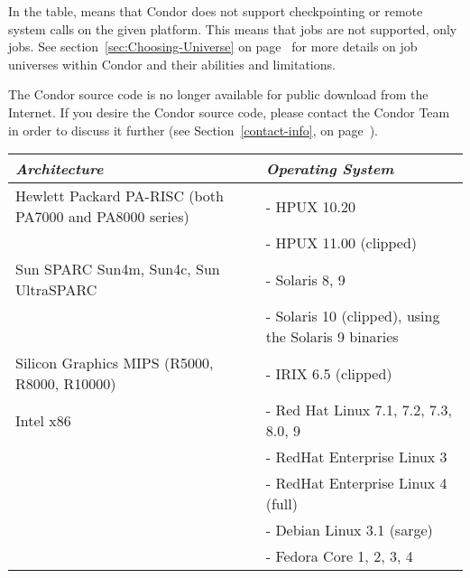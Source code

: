 In the table,  means that Condor does not support
checkpointing or remote system calls on the given platform. 
This means that  jobs are not supported, only
 jobs.
See section~\ref{sec:Choosing-Universe} on
page~\pageref{sec:Choosing-Universe} for more details on job universes
within Condor and their abilities and limitations.

The Condor source code is no longer available for public download from the Internet.  If you 
desire the Condor source code, please contact the Condor Team in order to discuss it further 
(see Section~\ref{contact-info}, on page~\pageref{contact-info}).

\begin{center}
\begin{table}[hbt]
\begin{tabular}{|p{6cm}p{7cm}|} \hline
\emph{Architecture} & \emph{Operating System} \\ \hline  \hline
Hewlett Packard PA-RISC (both PA7000 and PA8000 series) & - HPUX 10.20 \\
 & - HPUX 11.00 (clipped) \\ \hline
Sun SPARC Sun4m, Sun4c, Sun UltraSPARC & - Solaris 8, 9 \\
 & - Solaris 10 (clipped), using the Solaris 9 binaries \\ \hline
Silicon Graphics MIPS (R5000, R8000, R10000) & - IRIX 6.5 (clipped) \\ \hline
Intel x86 & - Red Hat Linux 7.1, 7.2, 7.3, 8.0, 9 \\
 & - RedHat Enterprise Linux 3 \\
 & - RedHat Enterprise Linux 4 (full) \\
 & - Debian Linux 3.1 (sarge) \\
 & - Fedora Core 1, 2, 3, 4 \\

\end{tabular}
\end{table}
\end{center}

